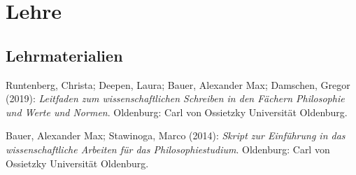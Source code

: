 \documentclass[a4paper,10pt]{article}
\newenvironment{literature}{%
   \parskip6pt\parindent0pt\raggedright
   \def\lititem{\hangindent=1cm\hangafter1}}{%
   \par\ignorespaces}
\begin{document}
\clearpage
\section{Lehre}
\subsection*{Lehrmaterialien}
\begin{literature}
\lititem Runtenberg, Christa; Deepen, Laura; Bauer, Alexander Max; Damschen, Gregor (2019): \textit{Leitfaden zum wissenschaftlichen Schreiben in den Fächern Philosophie und Werte und Normen}. Oldenburg: Carl von Ossietzky Universität Oldenburg.

\lititem Bauer, Alexander Max; Stawinoga, Marco (2014): \textit{Skript zur Einführung in das wissenschaftliche Arbeiten für das Philosophiestudium}. Oldenburg: Carl von Ossietzky Universität Oldenburg.
\end{literature}
\end{document}
